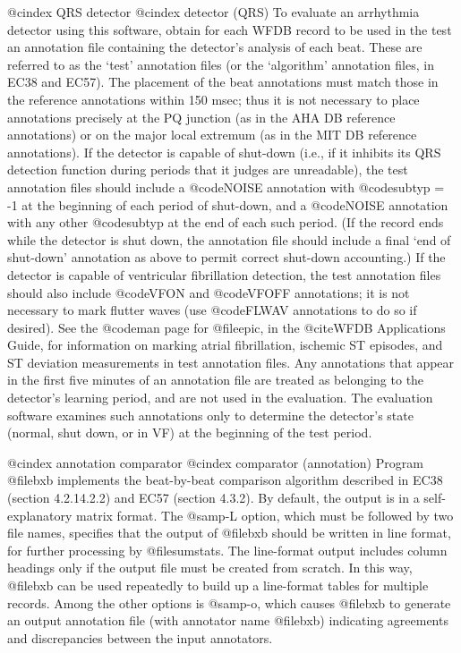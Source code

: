 {{{{{{{{{@cindex QRS detector
@cindex detector (QRS)
To evaluate an arrhythmia detector using this software, obtain for each
WFDB record to be used in the test an annotation file containing the
detector's analysis of each beat.  These are referred to as the `test'
annotation files (or the `algorithm' annotation files, in EC38 and EC57).
The placement of the beat annotations must match those in the reference
annotations within 150 msec; thus it is not necessary to place
annotations precisely at the PQ junction (as in the AHA DB reference
annotations) or on the major local extremum (as in the MIT DB reference
annotations).  If the detector is capable of shut-down (i.e., if it
inhibits its QRS detection function during periods that it judges are
unreadable), the test annotation files should include a @code{NOISE}
annotation with @code{subtyp = -1} at the beginning of each period of
shut-down, and a @code{NOISE} annotation with any other @code{subtyp}
at the end of each such period.  (If the record ends while the detector
is shut down, the annotation file should include a final `end of shut-down'
annotation as above to permit correct shut-down accounting.)  If the
detector is capable of ventricular fibrillation detection, the test
annotation files should also include @code{VFON} and @code{VFOFF}
annotations; it is not necessary to mark flutter waves (use @code{FLWAV}
annotations to do so if desired).  See the @code{man} page for @file{epic},
in the @cite{WFDB Applications Guide}, for information on marking
atrial fibrillation, ischemic ST episodes, and ST deviation measurements
in test annotation files.  Any annotations that appear in the
first five minutes of an annotation file are treated as belonging to the
detector's learning period, and are not used in the evaluation.  The
evaluation software examines such annotations only to determine the
detector's state (normal, shut down, or in VF) at the beginning of the
test period.

@cindex annotation comparator
@cindex comparator (annotation)
Program @file{bxb} implements the beat-by-beat comparison algorithm described
in EC38 (section 4.2.14.2.2) and EC57 (section 4.3.2).  By default, the output
is in a self-explanatory matrix format.  The @samp{-L} option, which must be
followed by two file names, specifies that the output of @file{bxb} should be
written in line format, for further processing by @file{sumstats}.  The
line-format output includes column headings only if the output file must be
created from scratch.  In this way, @file{bxb} can be used repeatedly to build
up a line-format tables for multiple records.  Among the other options is
@samp{-o}, which causes @file{bxb} to generate an output annotation file (with
annotator name @file{bxb}) indicating agreements and discrepancies between the
input annotators.

}}}}}}}}}

